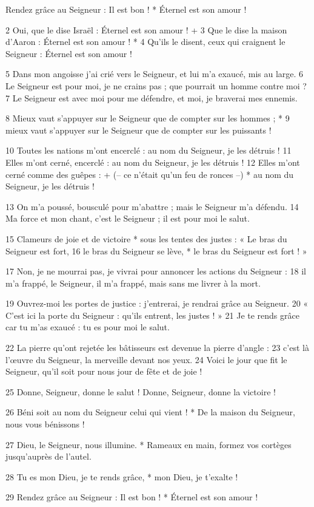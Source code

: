 Rendez grâce au Seigneur : Il est bon ! *
Éternel est son amour !

2 Oui, que le dise Israël :
Éternel est son amour ! +
3 Que le dise la maison d'Aaron :
Éternel est son amour ! *
4 Qu'ils le disent, ceux qui craignent le Seigneur :
Éternel est son amour !

5 Dans mon angoisse j'ai crié vers le Seigneur,
et lui m'a exaucé, mis au large.
6 Le Seigneur est pour moi, je ne crains pas ;
que pourrait un homme contre moi ?
7 Le Seigneur est avec moi pour me défendre,
et moi, je braverai mes ennemis.

8 Mieux vaut s'appuyer sur le Seigneur
que de compter sur les hommes ; *
9 mieux vaut s'appuyer sur le Seigneur
que de compter sur les puissants !

10 Toutes les nations m'ont encerclé :
au nom du Seigneur, je les détruis !
11 Elles m'ont cerné, encerclé :
au nom du Seigneur, je les détruis !
12 Elles m'ont cerné comme des guêpes : +
(– ce n'était qu'un feu de ronces –) *
au nom du Seigneur, je les détruis !

13 On m'a poussé, bousculé pour m'abattre ;
mais le Seigneur m'a défendu.
14 Ma force et mon chant, c'est le Seigneur ;
il est pour moi le salut.

15 Clameurs de joie et de victoire *
sous les tentes des justes :
« Le bras du Seigneur est fort,
16 le bras du Seigneur se lève, *
le bras du Seigneur est fort ! »

17 Non, je ne mourrai pas, je vivrai
pour annoncer les actions du Seigneur :
18 il m'a frappé, le Seigneur, il m'a frappé,
mais sans me livrer à la mort.

19 Ouvrez-moi les portes de justice :
j'entrerai, je rendrai grâce au Seigneur.
20 « C'est ici la porte du Seigneur :
qu'ils entrent, les justes ! »
21 Je te rends grâce car tu m'as exaucé :
tu es pour moi le salut.

22 La pierre qu'ont rejetée les bâtisseurs
est devenue la pierre d'angle :
23 c'est là l'œuvre du Seigneur,
la merveille devant nos yeux.
24 Voici le jour que fit le Seigneur,
qu'il soit pour nous jour de fête et de joie !

25 Donne, Seigneur, donne le salut !
Donne, Seigneur, donne la victoire !

26 Béni soit au nom du Seigneur
celui qui vient ! *
De la maison du Seigneur,
nous vous bénissons !

27 Dieu, le Seigneur, nous illumine. *
Rameaux en main, formez vos cortèges
jusqu'auprès de l'autel.

28 Tu es mon Dieu, je te rends grâce, *
mon Dieu, je t'exalte !

29 Rendez grâce au Seigneur : Il est bon ! *
Éternel est son amour !